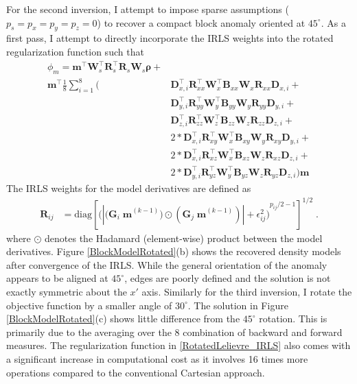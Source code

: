 For the second inversion, I attempt to impose sparse assumptions ($p_s=p_x=p_y=p_z=0$) to recover a compact block anomaly oriented at $45^\circ$.
As a first pass, I attempt to directly incorporate the IRLS weights into the rotated regularization function such that
\begin{equation}\label{RotatedLelievre_IRLS}
\begin{split}
\phi_m = \mathbf{m}^\top \mathbf{W}_s^\top \mathbf{R}_s^\top \mathbf{R}_s \mathbf{W}_s \boldsymbol{\rho} +& \\
\mathbf{m}^\top \frac{1}{8}\sum_{i=1}^8 \bigg(&
\mathbf{D}_{x,i}^\top \mathbf{R}_{xx}^\top\mathbf{W}_{x}^\top\mathbf{B}_{xx}\mathbf{W}_{x}\mathbf{R}_{xx} \mathbf{D}_{x,i} +\\
&\mathbf{D}_{y,i}^\top \mathbf{R}_{yy}^\top\mathbf{W}_{y}^\top\mathbf{B}_{yy}\mathbf{W}_{y} \mathbf{R}_{yy} \mathbf{D}_{y,i}+\\
&\mathbf{D}_{z,i}^\top \mathbf{R}_{zz}^\top\mathbf{W}_{z}^\top\mathbf{B}_{zz}\mathbf{W}_{z} \mathbf{R}_{zz}\mathbf{D}_{z,i} +\\
&2*\mathbf{D}_{x,i}^\top \mathbf{R}_{xy}^\top\mathbf{W}_{x}^\top\mathbf{B}_{xy}\mathbf{W}_{y}\mathbf{R}_{xy} \mathbf{D}_{y,i} +\\
&2*\mathbf{D}_{x,i}^\top \mathbf{R}_{xz}^\top\mathbf{W}_{x}^\top\mathbf{B}_{xz}\mathbf{W}_{z} \mathbf{R}_{xz}\mathbf{D}_{z,i} +\\
&2*\mathbf{D}_{y,i}^\top \mathbf{R}_{yz}^\top\mathbf{W}_{y}^\top\mathbf{B}_{yz}\mathbf{W}_{z}\mathbf{R}_{yz} \mathbf{D}_{z,i} \bigg) \mathbf{m}
\end{split}
\end{equation}
The IRLS weights for the model derivatives are defined as
\begin{equation}
\begin{split}
	\mathbf{R}_{ij} &= \text{diag} \left[{\Big( |{({\mathbf{ G}_i\;\mathbf{m}}^{(k-1)}})\odot({{\mathbf{ G}_j\;\mathbf{m}}^{(k-1)}})| + \epsilon_{ij}^2 \Big)}^{p_{ij}/2 - 1} \right]^{1/2} \;.
\end{split}
\end{equation}
where $\odot$ denotes the Hadamard (element-wise) product between the model derivatives.
Figure \ref{BlockModelRotated}(b) shows the recovered density models after convergence of the IRLS.
While the general orientation of the anomaly appears to be aligned at $45^\circ$, edges are poorly defined and the solution is not exactly symmetric about the $x'$ axis.
Similarly for the third inversion, I rotate the objective function by a smaller angle of $30^\circ$. The solution in Figure \ref{BlockModelRotated}(c) shows little difference from the $45^\circ$ rotation. This is primarily due to the averaging over the 8 combination of backward and forward measures. The regularization function in \eqref{RotatedLelievre_IRLS} also comes with a significant increase in computational cost as it involves 16 times more operations compared to the conventional Cartesian approach.
